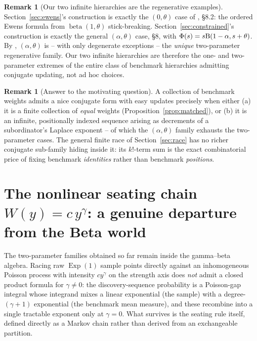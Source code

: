 \documentclass[11pt]{article}
\DeclareMathOperator{\Exp}{Exp}
\theoremstyle{plain}
\theoremstyle{definition}
\newtheorem{remark}[theorem]{Remark}
\begin{document}
\begin{remark}[Our two infinite hierarchies are the regenerative examples]
Section~\ref{sec:ewens}'s construction is exactly the \((0,\theta)\) case of \cite{GnedinPitman2005}, \S8.2: the ordered Ewens formula from \(\operatorname{beta}(1,\theta)\) stick-breaking. Section~\ref{sec:constrained}'s construction is exactly the general \((\alpha,\theta)\) case, \S8, with \(\Phi(s)=s{\rm B}(1-\alpha,s+\theta)\). By \cite[Thm.~8.1]{GnedinPitman2005}, \((\alpha,\theta)\) is -- with only degenerate exceptions -- the \emph{unique} two-parameter regenerative family. Our two infinite hierarchies are therefore the one- and two-parameter extremes of the entire class of benchmark hierarchies admitting conjugate updating, not ad hoc choices.
\end{remark}

\begin{remark}[Answer to the motivating question]
A collection of benchmark weights admits a nice conjugate form with easy updates precisely when either (a) it is a finite collection of \emph{equal} weights (Proposition~\ref{prop:matched}), or (b) it is an infinite, positionally indexed sequence arising as decrements of a subordinator's Laplace exponent -- of which the \((\alpha,\theta)\) family exhausts the two-parameter cases. The general finite race of Section~\ref{sec:race} has no richer conjugate sub-family hiding inside it: its \(k!\)-term sum is the exact combinatorial price of fixing benchmark \emph{identities} rather than benchmark \emph{positions}.
\end{remark}

\section{The nonlinear seating chain \(W(y)=c\,y^\gamma\): a genuine departure from the Beta world}
\label{sec:three-param}

The two-parameter families obtained so far remain inside the gamma--beta algebra. Racing raw \(\Exp(1)\) sample points directly against an inhomogeneous Poisson process with intensity \(cy^\gamma\) on the strength axis does \emph{not} admit a closed product formula for \(\gamma\neq0\): the discovery-sequence probability is a Poisson-gap integral whose integrand mixes a linear exponential (the sample) with a degree-\((\gamma+1)\) exponential (the benchmark mean measure), and these recombine into a single tractable exponent only at \(\gamma=0\). What survives is the seating rule itself, defined directly as a Markov chain rather than derived from an exchangeable partition.
\end{document}
